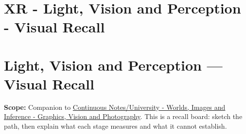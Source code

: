 \hypertarget{appendix-73c6b8ed5a87}{}
\section*{XR - Light, Vision and Perception - Visual Recall}
\section{Light, Vision and Perception --- Visual Recall}\label{light-vision-and-perception-visual-recall}

\textbf{Scope:} Companion to \href{Continuous\%20Notes/University\%20-\%20Worlds,\%20Images\%20and\%20Inference\%20-\%20Graphics,\%20Vision\%20and\%20Photography}{Continuous Notes/University - Worlds, Images and Inference - Graphics, Vision and Photography}. This is a recall board: sketch the path, then explain what each stage measures and what it cannot establish.

